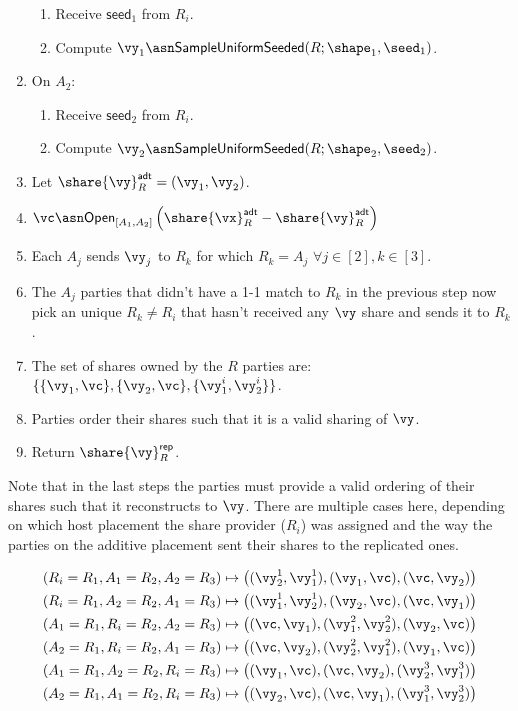 \begin{enumerate}
\begin{enumerate}
    \item Receive $\mathsf{seed}_1$ from $R_i$.
    \item Compute $\vy_1 \asn \mathsf{SampleUniformSeeded}(R; \shape_1, \seed_1)$.
\end{enumerate}
\item On $A_2$:
\begin{enumerate}
    \item Receive $\mathsf{seed}_2$ from $R_i$.
    \item Compute $\vy_2 \asn \mathsf{SampleUniformSeeded}(R; \shape_2, \seed_2)$.
\end{enumerate}
\item Let $\share{\vy}^{\mathsf{adt}}_{R} = (\vy_1, \vy_2)$.
\item $\vc \asn \mathsf{Open}_{[A_1, A_2]}\left( \share{\vx}^{\mathsf{adt}}_{R}
- \share{\vy}^{\mathsf{adt}}_{R} \right)$
\item Each $A_j$ sends $\vy_j$ to $R_k$ for which $R_k = A_j$ $\forall j \in [2], k \in [3]$.
\item The $A_j$ parties that didn't have a 1-1 match to $R_k$ in the previous step now pick an unique $R_k \neq R_i$
that hasn't received any $\vy$ share and sends it to $R_k$.
\item The set of shares owned by the $R$ parties are: $\{ \{\vy_1, \vc\}, \{\vy_2, \vc\}, \{\vy^i_1, \vy^i_2\} \}$.
\item Parties order their shares such that it is a valid sharing of $\vy$.
\item Return $\share{\vy}^{\mathsf{rep}}_{R}$.
\end{enumerate}

Note that in the last steps the parties must provide a valid ordering of their
shares such that it reconstructs to $\vy$. There are multiple cases here,
depending on which host placement the share provider ($R_i$) was assigned and
the way the parties on the additive placement sent their shares to the replicated ones.

\begin{align*}
(R_i = R_1, A_1 = R_2, A_2 = R_3) \mapsto \left( (\vy_2^1, \vy_1^1), (\vy_1, \vc), (\vc, \vy_2) \right) \\
(R_i = R_1, A_2 = R_2, A_1 = R_3) \mapsto \left( (\vy_1^1, \vy_2^1), (\vy_2, \vc), (\vc, \vy_1) \right) \\
(A_1 = R_1, R_i = R_2, A_2 = R_3) \mapsto \left( (\vc, \vy_1), (\vy^2_1, \vy^2_2), (\vy_2, \vc) \right) \\
(A_2 = R_1, R_i = R_2, A_1 = R_3) \mapsto \left( (\vc, \vy_2), (\vy^2_2, \vy^2_1), (\vy_1, \vc) \right) \\
(A_1 = R_1, A_2 = R_2, R_i = R_3) \mapsto \left( (\vy_1, \vc), (\vc, \vy_2), (\vy_2^3, \vy_1^3) \right) \\
(A_2 = R_1, A_1 = R_2, R_i = R_3) \mapsto \left( (\vy_2, \vc), (\vc, \vy_1), (\vy_1^3, \vy_2^3) \right)
\end{align*}